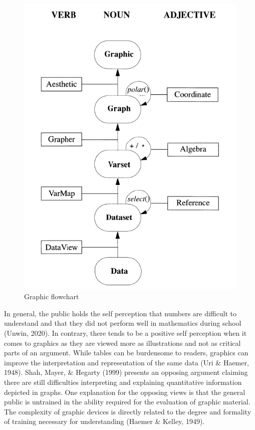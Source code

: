 \documentclass[print]{nuthesis}
\begin{document}
\begin{figure}

{\centering \includegraphics[width=0.5\linewidth]{images/graphic-flowchart} 

}

\caption{Graphic flowchart}\label{fig:graphic-flowchart}
\end{figure}

In general, the public holds the self perception that numbers are difficult to understand and that they did not perform well in mathematics during school (Unwin, 2020).
In contrary, there tends to be a positive self perception when it comes to graphics as they are viewed more as illustrations and not as critical parts of an argument.
While tables can be burdensome to readers, graphics can improve the interpretation and representation of the same data (Uri \& Haemer, 1948).
Shah, Mayer, \& Hegarty (1999) presents an opposing argument claiming there are still difficulties interpreting and explaining quantitative information depicted in graphs.
One explanation for the opposing views is that the general public is untrained in the ability required for the evaluation of graphic material.
The complexity of graphic devices is directly related to the degree and formality of training necessary for understanding (Haemer \& Kelley, 1949).
\end{document}
